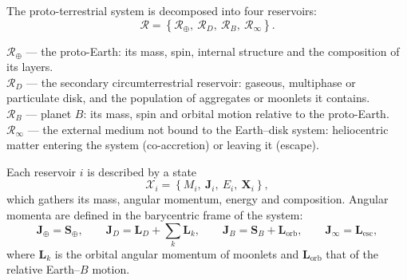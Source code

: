 \documentclass[11pt,a4paper,openany]{report}
\newcommand{\RT}{\mathcal{R}_{\oplus}}
\newcommand{\RD}{\mathcal{R}_{D}}
\newcommand{\RB}{\mathcal{R}_{B}}
\newcommand{\Rinf}{\mathcal{R}_{\infty}}
\begin{document}
The proto-terrestrial system is decomposed into four reservoirs:
\begin{equation}
\mathcal{R}=\left\{\RT,\ \RD,\ \RB,\ \Rinf\right\}.
\label{eq:reservoirs}
\end{equation}

\begin{definition}
\textbf{$\RT$} --- the proto-Earth: its mass, spin, internal structure and the composition of its
layers.\\
\textbf{$\RD$} --- the secondary circumterrestrial reservoir: gaseous, multiphase or particulate disk,
and the population of aggregates or moonlets it contains.\\
\textbf{$\RB$} --- planet $B$: its mass, spin and orbital motion relative to the proto-Earth.\\
\textbf{$\Rinf$} --- the external medium not bound to the Earth--disk system: heliocentric matter
entering the system (co-accretion) or leaving it (escape).
\end{definition}

Each reservoir $i$ is described by a state
\begin{equation}
\mathcal{X}_i=\left\{M_i,\ \mathbf{J}_i,\ E_i,\ \mathbf{X}_i\right\},
\label{eq:etat-reservoir}
\end{equation}
which gathers its mass, angular momentum, energy and composition. Angular momenta are defined in
the barycentric frame of the system:
\begin{equation}
\mathbf{J}_\oplus=\mathbf{S}_\oplus,\qquad
\mathbf{J}_D=\mathbf{L}_D+\sum_k\mathbf{L}_k,\qquad
\mathbf{J}_B=\mathbf{S}_B+\mathbf{L}_{\mathrm{orb}},\qquad
\mathbf{J}_\infty=\mathbf{L}_{\mathrm{esc}},
\label{eq:J-reservoirs}
\end{equation}
where $\mathbf{L}_k$ is the orbital angular momentum of moonlets and $\mathbf{L}_{\mathrm{orb}}$ that of
the relative Earth--$B$ motion.
\end{document}
